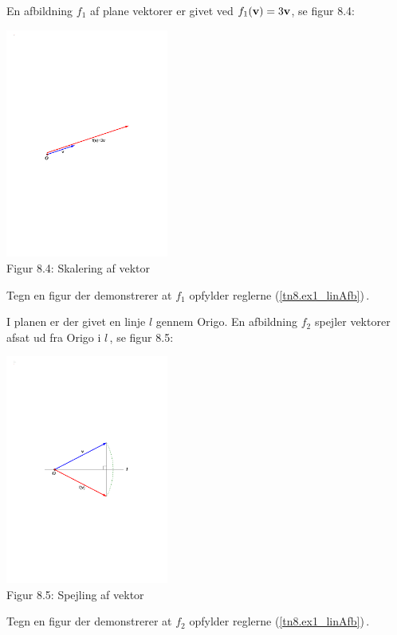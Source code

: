\begin{exercise}
En afbildning $f_1$ af plane vektorer er givet ved $f_1(\mathbf{v})=3\mathbf{v}$, se figur 8.4:
\begin{center}
		\includegraphics[trim=5cm 12cm 5cm
 12cm,width=0.40\textwidth,clip]{skalering.pdf}
  \\Figur 8.4: Skalering af vektor 
\end{center}
Tegn en figur der demonstrerer at $f_1$ opfylder reglerne (\ref{tn8.ex1_linAfb})\,.
\end{exercise}

\begin{exercise}
I planen er der givet en linje $l$ gennem Origo. En afbildning $f_2$ spejler vektorer afsat ud fra Origo i $l\,$, se figur 8.5:
\begin{center}
		\includegraphics[trim=5cm 11cm 5cm
 11cm,width=0.40\textwidth,clip]{spejling.pdf}
  \\Figur 8.5: Spejling af vektor 
\end{center}
Tegn en figur der demonstrerer at $f_2$ opfylder reglerne (\ref{tn8.ex1_linAfb})\,.
\end{exercise}

